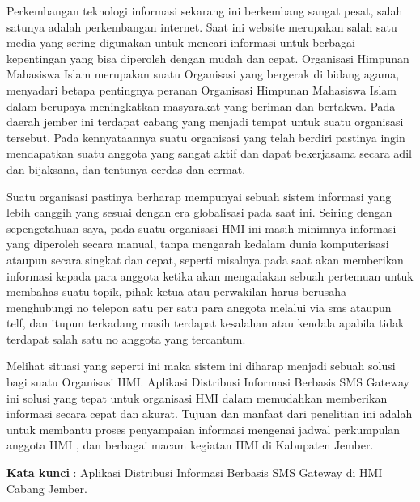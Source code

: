 \documentclass{jtetiproposalskripsi}
\begin{document}
\cover

\approvalpage


\begin{abstractind}
Perkembangan  teknologi informasi sekarang ini berkembang sangat pesat, salah satunya adalah perkembangan internet. Saat ini website merupakan salah satu media yang sering digunakan untuk mencari informasi untuk berbagai kepentingan yang bisa diperoleh dengan mudah dan cepat. Organisasi Himpunan Mahasiswa Islam merupakan suatu Organisasi yang bergerak di bidang agama, menyadari betapa pentingnya peranan Organisasi Himpunan Mahasiswa Islam dalam berupaya meningkatkan masyarakat yang beriman dan bertakwa. Pada daerah jember ini terdapat cabang yang menjadi tempat untuk suatu organisasi tersebut. Pada kennyataannya suatu organisasi yang telah berdiri pastinya ingin mendapatkan suatu anggota yang sangat aktif dan dapat bekerjasama secara adil dan bijaksana, dan tentunya cerdas dan cermat. 

Suatu organisasi pastinya berharap mempunyai sebuah sistem informasi yang lebih canggih yang sesuai dengan era globalisasi pada saat ini. Seiring dengan sepengetahuan saya, pada suatu organisasi HMI ini masih minimnya informasi yang diperoleh secara manual, tanpa mengarah kedalam dunia komputerisasi ataupun secara singkat dan cepat, seperti misalnya pada saat akan memberikan informasi kepada para anggota ketika akan mengadakan sebuah pertemuan untuk membahas suatu topik, pihak ketua atau perwakilan harus berusaha menghubungi no telepon satu per satu para anggota melalui via sms ataupun telf, dan itupun terkadang masih terdapat kesalahan atau kendala apabila tidak terdapat salah satu no anggota yang tercantum. 

Melihat situasi yang seperti ini maka sistem ini diharap menjadi sebuah solusi bagi suatu Organisasi HMI. Aplikasi Distribusi Informasi Berbasis SMS Gateway ini solusi yang tepat untuk organisasi HMI dalam memudahkan memberikan informasi secara cepat dan akurat. 
Tujuan dan manfaat dari penelitian ini adalah untuk membantu proses penyampaian informasi mengenai jadwal perkumpulan anggota HMI , dan berbagai macam kegiatan HMI di Kabupaten Jember.



\bigskip
\textbf{Kata kunci} : Aplikasi Distribusi Informasi Berbasis SMS Gateway di HMI Cabang Jember.
\end{abstractind}
\end{document}
